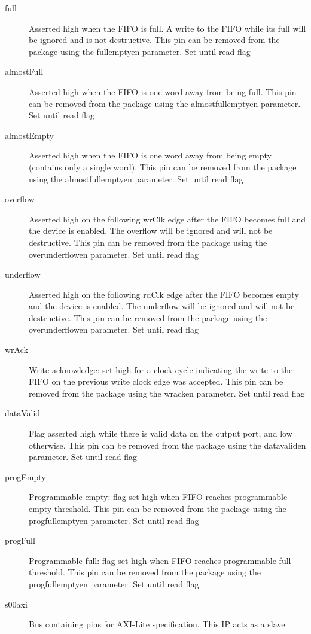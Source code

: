 \documentclass[11pt]{article}
\begin{document}
\begin{description}
	\item[full]Asserted high when the FIFO is full. A write to the FIFO while its full will be ignored and is not destructive. This pin can be removed
		from the package using the full\textunderscore empty\textunderscore en parameter. Set until read flag
	\item[almostFull]Asserted high when the FIFO is one word away from being full. This pin can be removed from the package using the
		almost\textunderscore full\textunderscore empty\textunderscore en parameter. Set until read flag
	\item[almostEmpty]Asserted high when the FIFO is one word away from being empty (contains only a single word). This pin can be removed from the
		package using the almost\textunderscore full\textunderscore empty\textunderscore en parameter. Set until read flag
	\item[overflow]Asserted high on the following wrClk edge after the FIFO becomes full and the device is enabled. The overflow will be ignored and will
		not be destructive. This pin can be removed from the package using the over\textunderscore under\textunderscore flow\textunderscore en parameter.
		Set until read flag
	\item[underflow]Asserted high on the following rdClk edge after the FIFO becomes empty and the device is enabled. The underflow will be ignored and
		will not be destructive. This pin can be removed from the package using the over\textunderscore under\textunderscore flow\textunderscore en
		parameter. Set until read flag
	\item[wrAck]Write acknowledge: set high for a clock cycle indicating the write to the FIFO on the previous write clock edge was accepted. This pin can
		be removed from the package using the wr\textunderscore ack\textunderscore en parameter. Set until read flag
	\item[dataValid]Flag asserted high while there is valid data on the output port, and low otherwise. This pin can be removed from the package using the
		data\textunderscore valid\textunderscore en parameter. Set until read flag
	\item[progEmpty]Programmable empty: flag set high when FIFO reaches programmable empty threshold. This pin can be removed from the package using the
		prog\textunderscore full\textunderscore empty\textunderscore en parameter. Set until read flag
	\item[progFull]Programmable full: flag set high when FIFO reaches programmable full threshold. This pin can be removed from the package using the
		prog\textunderscore full\textunderscore empty\textunderscore en parameter. Set until read flag
	\item[s00\textunderscore axi]Bus containing pins for AXI-Lite specification. This IP acts as a slave
\end{description}
\end{document}
